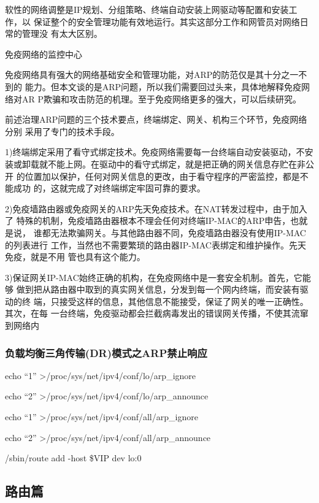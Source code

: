 \documentclass[letterpaper,10pt]{sphinxmanual}
\begin{document}
软性的网络调整是IP规划、分组策略、终端自动安装上网驱动等配置和安装工作，以
保证整个的安全管理功能有效地运行。其实这部分工作和网管员对网络日常的管理没
有太大区别。

免疫网络的监控中心

免疫网络具有强大的网络基础安全和管理功能，对ARP的防范仅是其十分之一不到的
能力。但本文谈的是ARP问题，所以我们需要回过头来，具体地解释免疫网络对AR
P欺骗和攻击防范的机理。至于免疫网络更多的强大，可以后续研究。

前述治理ARP问题的三个技术要点，终端绑定、网关、机构三个环节，免疫网络分别
采用了专门的技术手段。

1)终端绑定采用了看守式绑定技术。免疫网络需要每一台终端自动安装驱动，不安
装或卸载就不能上网。在驱动中的看守式绑定，就是把正确的网关信息存贮在非公开
的位置加以保护，任何对网关信息的更改，由于看守程序的严密监控，都是不能成功
的，这就完成了对终端绑定牢固可靠的要求。

2)免疫墙路由器或免疫网关的ARP先天免疫技术。在NAT转发过程中，由于加入了
特殊的机制，免疫墙路由器根本不理会任何对终端IP-MAC的ARP申告，也就是说，
谁都无法欺骗网关。与其他路由器不同，免疫墙路由器没有使用IP-MAC的列表进行
工作，当然也不需要繁琐的路由器IP-MAC表绑定和维护操作。先天免疫，就是不用
管也具有这个能力。

3)保证网关IP-MAC始终正确的机构，在免疫网络中是一套安全机制。首先，它能够
做到把从路由器中取到的真实网关信息，分发到每一个网内终端，而安装有驱动的终
端，只接受这样的信息，其他信息不能接受，保证了网关的唯一正确性。其次，在每
一台终端，免疫驱动都会拦截病毒发出的错误网关传播，不使其流窜到网络内


\subsubsection{负载均衡三角传输(DR)模式之ARP禁止响应}
\label{Linux_net/arp:dr-arp}
echo ``1'' \textgreater{}/proc/sys/net/ipv4/conf/lo/arp\_ignore

echo ``2'' \textgreater{}/proc/sys/net/ipv4/conf/lo/arp\_announce

echo ``1'' \textgreater{}/proc/sys/net/ipv4/conf/all/arp\_ignore

echo ``2'' \textgreater{}/proc/sys/net/ipv4/conf/all/arp\_announce

/sbin/route add -host \$VIP dev lo:0


\subsection{路由篇}
\label{Linux_net/route::doc}\label{Linux_net/route:id1}
\end{document}

